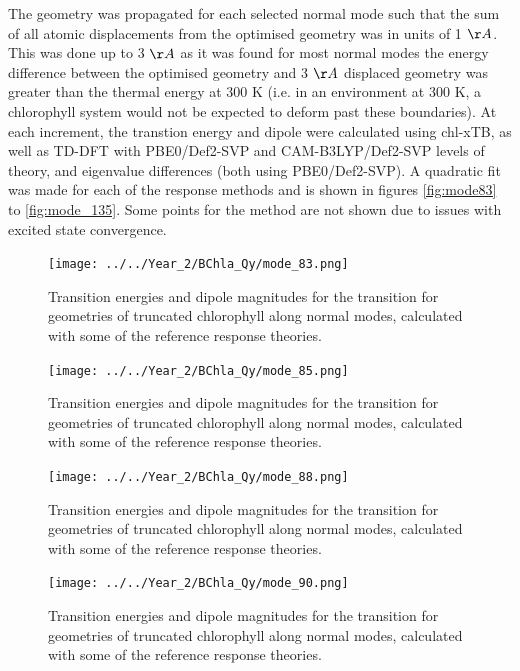 The geometry was propagated for each selected normal mode such that the sum of
all atomic displacements from the optimised geometry was in units of 1 $\AA{}$.
This was done up to 3 $\AA{}$ as it was found for most normal modes the energy 
difference between the optimised geometry and 3 $\AA{}$ displaced geometry was greater
than the thermal energy at 300 K (i.e. in an environment at 300 K, a chlorophyll 
system would not be expected to deform past these boundaries). At each increment,
the \Qy transtion energy and dipole were calculated using chl-xTB, as well as TD-DFT
with PBE0/Def2-SVP and CAM-B3LYP/Def2-SVP levels of theory, \dscf and eigenvalue 
differences (both using PBE0/Def2-SVP). A quadratic fit was made for each of the
response methods and is shown in figures \ref{fig:mode83} to \ref{fig:mode_135}. 
Some points for the \dscf method are not shown due to issues with excited state 
convergence.

\begin{figure}
    \centering
    \texttt{[image: ../../Year\_2/BChla\_Qy/mode\_83.png]}
    \label{fig:mode_83}
    \caption{Transition energies and dipole magnitudes for the \Qy transition for
    geometries of truncated chlorophyll along normal modes, calculated with some 
    of the reference response theories.}
\end{figure}

\begin{figure}
    \centering
    \texttt{[image: ../../Year\_2/BChla\_Qy/mode\_85.png]}
    \label{fig:mode_85}
    \caption{Transition energies and dipole magnitudes for the \Qy transition for
    geometries of truncated chlorophyll along normal modes, calculated with some 
    of the reference response theories.}
\end{figure}

\begin{figure}
    \centering
    \texttt{[image: ../../Year\_2/BChla\_Qy/mode\_88.png]}
    \label{fig:mode_88}
    \caption{Transition energies and dipole magnitudes for the \Qy transition for
    geometries of truncated chlorophyll along normal modes, calculated with some 
    of the reference response theories.}
\end{figure}

\begin{figure}
    \centering
    \texttt{[image: ../../Year\_2/BChla\_Qy/mode\_90.png]}
    \label{fig:mode_90}
    \caption{Transition energies and dipole magnitudes for the \Qy transition for
    geometries of truncated chlorophyll along normal modes, calculated with some 
    of the reference response theories.}
\end{figure}

